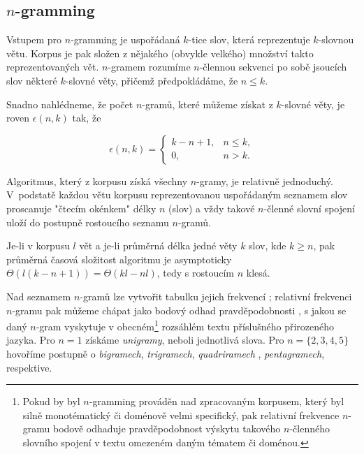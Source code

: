 \subsection{$n$-gramming}

Vstupem pro $n$-gramming je uspořádaná $k$-tice slov, která reprezentuje
$k$-slovnou větu. Korpus je pak složen z nějakého (obvykle velkého) množství
takto reprezentovaných vět. $n$-gramem rozumíme $n$-člennou sekvenci po sobě
jsoucích slov některé $k$-slovné věty, přičemž předpokládáme, že $n \leq k$.

Snadno nahlédneme, že počet $n$-gramů, které můžeme získat z $k$-slovné věty,
je roven $\epsilon(n, k)$ tak, že

\begin{equation*}
  \epsilon(n, k) = \left\{
  \begin{array}{rr}
  k - n + 1,  & n \leq k, \\
          0,  & n > k.
  \end{array} \right.
\end{equation*}

Algoritmus, který z korpusu získá všechny $n$-gramy,
je relativně jednoduchý.
V~podstatě každou větu korpusu reprezentovanou uspořádaným seznamem slov
proscanuje "čtecím okénkem" délky $n$ (slov) a vždy takové $n$-členné slovní
spojení uloží do postupně rostoucího seznamu $n$-gramů.

Je-li v korpusu $l$ vět a je-li průměrná délka jedné věty $k$ slov, kde
$k \geq n$, pak průměrná časová složitost algoritmu je asymptoticky
$\Theta(l(k - n + 1)) = \Theta(kl-nl)$, tedy s rostoucím $n$ klesá.

Nad seznamem $n$-gramů lze vytvořit tabulku jejich frekvencí%
; relativní
frekvenci $n$-gramu pak můžeme chápat jako bodový odhad pravděpodobnosti%
,
s jakou se daný $n$-gram vyskytuje v obecném\footnote{Pokud by byl $n$-gramming%
prováděn nad zpracovaným korpusem, který byl silně monotématický či doménově
velmi specifický, pak relativní frekvence $n$-gramu bodově odhaduje
pravděpodobnost výskytu takového $n$-členného slovního spojení v textu
omezeném daným tématem či doménou.} rozsáhlém textu příslušného
přirozeného jazyka. Pro $n = 1$ získáme \textit{unigramy}, neboli jednotlivá
slova. Pro $n = \{2, 3, 4, 5\}$ hovoříme postupně o \textit{bigramech},
\textit{trigramech}, \textit{quadriramech}%
, \textit{pentagramech}, respektive.

